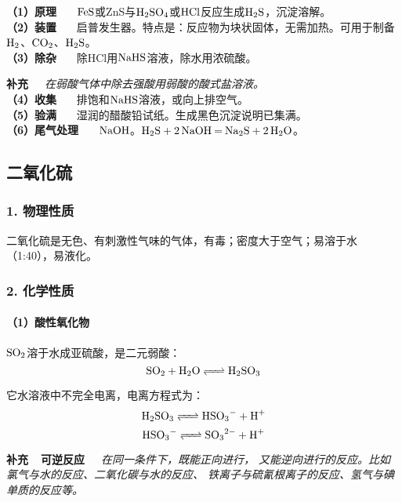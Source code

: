 \documentclass[12pt,a4paper]{ctexbook}
\begin{document}
\noindent
\textbf{（1）原理} \ \ \ $\ce{FeS}$或ZnS与$\ce{H2SO4}$或$\ce{HCl}$反应生成$\ce{H2S}$，沉淀溶解。\\
\textbf{（2）装置} \ \ \ 启普发生器。特点是：反应物为块状固体，无需加热。可用于制备$\ce{H2}$、$\ce{CO2}$、$\ce{H2S}$。\\
\textbf{（3）除杂} \ \ \ 除HCl用$\ce{NaHS}$溶液，除水用浓硫酸。

\textbf{补充}\ \ \ \textit{在弱酸气体中除去强酸用弱酸的酸式盐溶液。}\\
\textbf{（4）收集} \ \ \ 排饱和$\ce{NaHS}$溶液，或向上排空气。\\
\textbf{（5）验满} \ \ \ 湿润的醋酸铅试纸。生成黑色沉淀说明已集满。\\
\textbf{（6）尾气处理} \ \ \ $\ce{NaOH}$。$\ce{H2S + 2NaOH = Na2S + 2H2O}$。

\subsection{二氧化硫}

\subsubsection{1. 物理性质}

二氧化硫是无色、有刺激性气味的气体，有毒；密度大于空气；易溶于水（1:40），易液化。

\subsubsection{2. 化学性质}
\paragraph{（1）酸性氧化物}
$\ce{SO2}$溶于水成亚硫酸，是二元弱酸：
$$\ce{SO2 + H2O <=> H2SO3}$$

它水溶液中不完全电离，电离方程式为：
$$\ce{H2SO3 <=> HSO3^- + H^+}$$
$$\ce{HSO3^- <=> SO3^2- + H^+}$$

\textbf{补充\ \ 可逆反应}\ \ \ \textit{在同一条件下，既能正向进行，
	又能逆向进行的反应。比如氯气与水的反应、二氧化碳与水的反应、
	铁离子与硫氰根离子的反应、氢气与碘单质的反应等。}
\end{document}
